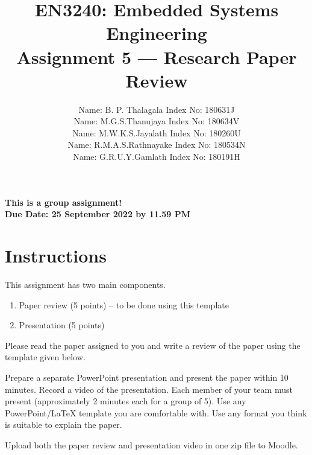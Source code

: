 \documentclass[11pt,letterpaper]{article}
\begin{document}
	
	\title{EN3240: Embedded Systems Engineering \\Assignment 5 --- Research Paper Review}
	
	\author{
		Name: B. P. Thalagala	 \qquad Index No:	180631J\\
		Name: M.G.S.Thanujaya	 \qquad Index No:	180634V\\
		Name: M.W.K.S.Jayalath \qquad Index No:		180260U\\
		Name: R.M.A.S.Rathnayake \qquad Index No:	180534N\\
		Name: G.R.U.Y.Gamlath	 \qquad Index No:	180191H\\
	}
	
	\maketitle
	
	\begin{center}
		\color{red}\bf This is a group assignment! \\ Due Date: 25 September 2022 by 11.59 PM
	\end{center}
	
	\section*{Instructions}
	
	This assignment has two main components.
	
	\begin{enumerate}[noitemsep]
		\item Paper review (5 points) -- to be done using this template
		\item Presentation (5 points)
	\end{enumerate}
	
	Please read the paper assigned to you and write a review of the paper using the template given below.
	
	Prepare a separate PowerPoint presentation and present the paper within 10 minutes. Record a video of the presentation. Each member of your team must present (approximately 2 minutes each for a group of 5). Use any PowerPoint/LaTeX template you are comfortable with. Use any format you think is suitable to explain the paper.
	
	Upload both the paper review and presentation video in one zip file to Moodle.
	
	\newpage
	
\end{document}
